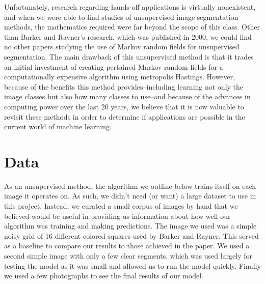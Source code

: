 \documentclass[11pt]{article}
\begin{document}
 Unfortunately, research regarding hands-off applications is virtually nonexistent, and when we were able to find studies of unsupervised image segmentation methods, the mathematics required were far beyond the scope of this class.
 Other than Barker and Rayner's research, which was published in 2000, we could find no other papers studying the use of Markov random fields for unsupervised segmentation.
 The main drawback of this unsupervised method is that it trades an initial investment of creating pertained Markov random fields for a computationally expensive algorithm using metropolis Hastings.
 However, because of the benefits this method provides--including learning not only the image classes but also how many classes to use--and because of the advances in computing power over the last 20 years, we believe that it is now valuable to revisit these methods in order to determine if applications are possible in the current world of machine learning.


\section{Data}
As an unsupervised method, the algorithm we outline below trains itself on each image it operates on. As such, we didn't need (or want) a large dataset to use in this project.
Instead, we curated a small corpus of images by hand that we believed would be useful in providing us information about how well our algorithm was training and making predictions.
The image we used was a simple noisy grid of 16 different colored squares used by Barker and Rayner.
This served as a baseline to compare our results to those achieved in the paper.
We used a second simple image with only a few clear segments, which was used largely for testing the model as it was small and allowed us to run the model quickly.
Finally we used a few photographs to see the final results of our model.
\end{document}
